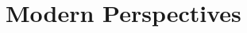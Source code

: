 \documentclass[../notes.tex]{subfiles}
\begin{document}
\section{Modern Perspectives}
\end{document}
